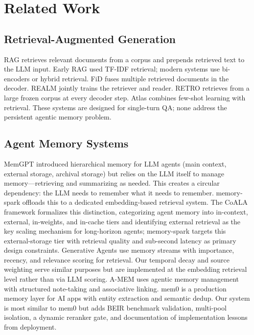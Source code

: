 \documentclass[11pt]{article}
\begin{document}
\section{Related Work}
\label{sec:related}

\subsection{Retrieval-Augmented Generation}

RAG \citep{lewis2020rag} retrieves relevant documents from a corpus and prepends retrieved text to the LLM input. Early RAG used TF-IDF retrieval;
modern systems use bi-encoders \citep{karpukhin2020dpr} or hybrid retrieval. FiD
\citep{izacard2021fid} fuses multiple retrieved documents in the decoder. REALM
\citep{guu2020realm} jointly trains the retriever and reader. RETRO \citep{borgeaud2022retro}
retrieves from a large frozen corpus at every decoder step. Atlas \citep{izacard2022atlas}
combines few-shot learning with retrieval. These systems are designed for single-turn QA;
none address the persistent agentic memory problem.

\subsection{Agent Memory Systems}

MemGPT \citep{packer2023memgpt} introduced hierarchical memory for LLM agents (main context,
external storage, archival storage) but relies on the LLM itself to manage memory---retrieving
and summarizing as needed. This creates a circular dependency: the LLM needs to remember
what it needs to remember. memory-spark offloads this to a dedicated embedding-based retrieval
system. The CoALA framework \citep{sumers2024cognitive} formalizes this distinction,
categorizing agent memory into in-context, external, in-weights, and in-cache tiers and
identifying external retrieval as the key scaling mechanism for long-horizon agents;
memory-spark targets this external-storage tier with retrieval quality and sub-second latency
as primary design constraints. Generative Agents \citep{park2023generative} use memory streams with importance,
recency, and relevance scoring for retrieval. Our temporal decay and source weighting serve
similar purposes but are implemented at the embedding retrieval level rather than via LLM
scoring. A-MEM \citep{amem2024} uses agentic memory management with structured note-taking
and associative linking. mem0 \citep{mem02024} is a production memory layer for AI apps
with entity extraction and semantic dedup. Our system is most similar to mem0 but adds
BEIR benchmark validation, multi-pool isolation, a dynamic reranker gate, and documentation of implementation lessons from deployment.
\end{document}
